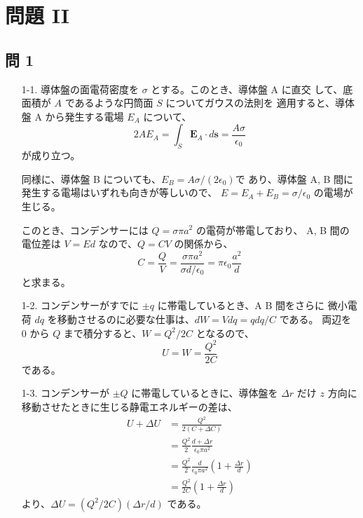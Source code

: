 \documentclass[report]{dennou777}
\begin{document}
\section{問題 II}

\subsection{問 1}
\begin{itemize}
	\item[1-1.]
		導体盤の面電荷密度を $\sigma$ とする。このとき、導体盤 A に直交
		して、底面積が $A$ であるような円筒面 $S$ についてガウスの法則を
		適用すると、導体盤 A から発生する電場 $E_A$ について、
		\[2AE_A=\int_S\mathbold{E}_A\cdot d\mathbold{s}=\frac{A\sigma}{\epsilon_0}\]
		が成り立つ。

		同様に、導体盤 B についても、$E_B=A\sigma/(2\epsilon_0)$で
		あり、導体盤 A, B 間に発生する電場はいずれも向きが等しいので、
		$E=E_A+E_B=\sigma/\epsilon_0$ の電場が生じる。

		このとき、コンデンサーには $Q=\sigma\pi a^2$ の電荷が帯電しており、
		A, B 間の電位差は $V=Ed$ なので、$Q=CV$ の関係から、
		\[C=\frac{Q}{V}=\frac{\sigma\pi a^2}{\sigma d/\epsilon_0}=\pi\epsilon_0\frac{a^2}{d}\]
		と求まる。
	\item[1-2.]
		コンデンサーがすでに $\pm q$ に帯電しているとき、A B 間をさらに
		微小電荷 $dq$ を移動させるのに必要な仕事は、$dW=Vdq=qdq/C$ である。
		両辺を $0$ から $Q$ まで積分すると、$W=Q^2/2C$ となるので、
		\[U=W=\frac{Q^2}{2C}\]
		である。
	\item[1-3.]
		コンデンサーが $\pm Q$ に帯電しているときに、導体盤を $\Delta r$
		だけ $z$ 方向に移動させたときに生じる静電エネルギーの差は、
		\begin{align*}
			U+\Delta U&=\frac{Q^2}{2(C+\Delta C)}\\
			&=\frac{Q^2}{2}\frac{d+\Delta r}{\epsilon_0\pi a^2}\\
			&=\frac{Q^2}{2}\frac{d}{\epsilon_0\pi a^2}\left(1+\frac{\Delta r}{d}\right)\\
			&=\frac{Q^2}{2C}\left(1+\frac{\Delta r}{d}\right)
		\end{align*}
		より、$\Delta U=(Q^2/2C)(\Delta r/d)$ である。


\end{itemize}
\end{document}
